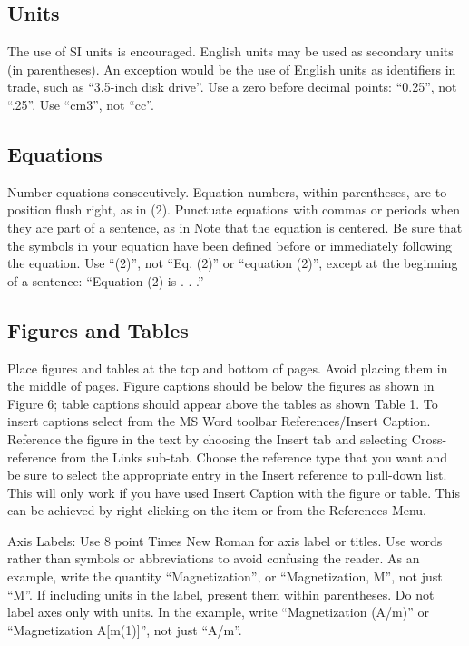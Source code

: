 \documentclass[10pt]{article}
\begin{document}
\subsection{Units}
The use of SI units is encouraged. English units may be used as secondary units (in parentheses). An exception would be the use of English units as identifiers in trade, such as “3.5-inch disk drive”. Use a zero before decimal points: “0.25”, not “.25”. Use “cm3”, not “cc”.
 
\subsection{Equations}
Number equations consecutively. Equation numbers, within parentheses, are to position flush right, as in (2). Punctuate equations with commas or periods when they are part of a sentence, as in
Note that the equation is centered. Be sure that the symbols in your equation have been defined before or immediately following the equation. Use “(2)”, not “Eq. (2)” or “equation (2)”, except at the beginning of a sentence: “Equation (2) is . . .”

\subsection{Figures and Tables}
Place figures and tables at the top and bottom of pages. Avoid placing them in the middle of pages. Figure captions should be below the figures as shown in Figure 6; table captions should appear above the tables as shown Table 1. To insert captions select from the MS Word toolbar References/Insert Caption.  Reference the figure in the text by choosing the Insert tab and selecting Cross-reference from the Links sub-tab.  Choose the reference type that you want and be sure to select the appropriate entry in the Insert reference to pull-down list.  This will only work if you have used Insert Caption with the figure or table. This can be achieved by right-clicking on the item or from the References Menu.
%
%

%
%
%

Axis Labels: Use 8 point Times New Roman for axis label or titles. Use words rather than symbols or abbreviations to avoid confusing the reader. As an example, write the quantity “Magnetization”, or “Magnetization, M”, not just “M”. If including units in the label, present them within parentheses. Do not label axes only with units. In the example, write “Magnetization (A/m)” or “Magnetization {A[m(1)]}”, not just “A/m”. 
\end{document}
